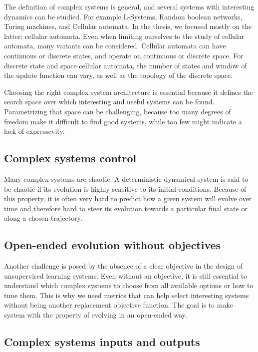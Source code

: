 The definition of complex systems is general, and several systems with
interesting dynamics can be studied. For example L-Systems, Random boolean
networks, Turing machines, and Cellular automata. In the thesis, we focused
mostly on the latter: cellular automata. Even when limiting ourselves to the
study of cellular automata, many variants can be considered. Cellular automata
can have continuous or discrete states, and operate on continuous or discrete
space. For discrete state and space cellular automata, the number of states and
window of the update function can vary, as well as the topology of the discrete
space.

Choosing the right complex system architecture is essential because it defines
the search space over which interesting and useful systems can be found.
Parametrizing that space can be challenging, because too many degrees of freedom
make it difficult to find good systems, while too few might indicate a lack of
expressevity.

\subsection{Complex systems control}

Many complex systems are chaotic. A deterministic dynamical system is said to be
chaotic if its evolution is highly sensitive to its initial conditions. Because
of this property, it is often very hard to predict how a given system will
evolve over time and therefore hard to steer its evolution towards a particular
final state or along a chosen trajectory.

\subsection{Open-ended evolution without objectives}

Another challenge is posed by the absence of a clear objective in the design of
unsupervised learning systems. Even without an objective, it is still essential
to understand which complex systems to choose from all available options or how
to tune them. This is why we need metrics that can help select interesting
systems without being another replacement objective function. The goal is to
make system with the property of evolving in an open-ended way.

\subsection{Complex systems inputs and outputs}

